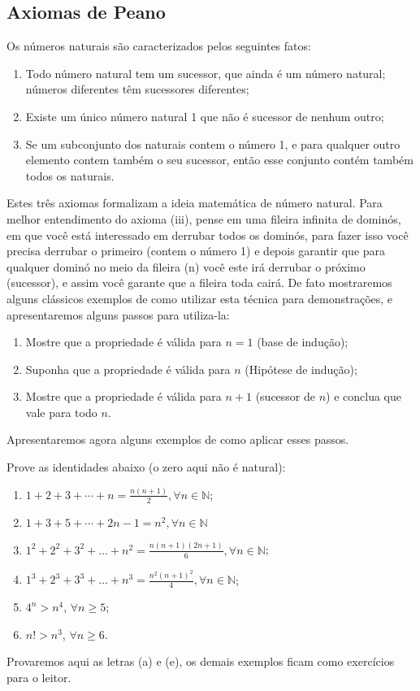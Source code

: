 \subsection{Axiomas de Peano}
\inic Os números naturais são caracterizados pelos seguintes fatos:
\begin{enumerate}
    \item [(i)] Todo número natural tem um sucessor, que ainda é um número natural; números diferentes têm sucessores diferentes;
    \item[(ii)] Existe um único número natural 1 que não é sucessor de nenhum outro;
    \item[(iii)] Se um subconjunto dos naturais contem o número 1, e para qualquer outro elemento contem também o seu sucessor, então esse conjunto contém também todos os naturais.
\end{enumerate}
\inic Estes três axiomas formalizam a ideia matemática de número natural. Para melhor entendimento do axioma (iii), pense em uma fileira infinita de dominós, em que você está interessado em derrubar todos os dominós, para fazer isso você precisa derrubar o primeiro (contem o número 1) e depois garantir que para qualquer dominó no meio da fileira (n) você este irá derrubar o próximo (sucessor), e assim você garante que a fileira toda cairá. De fato mostraremos alguns clássicos exemplos de como utilizar esta técnica para demonstrações, e apresentaremos alguns passos para utiliza-la:

\begin{enumerate}
    \item [(a)] Mostre que a propriedade é válida para $n=1$ (base de indução);
    \item[(b)] Suponha que a propriedade é válida para $n$ (Hipótese de indução);
    \item[(c)] Mostre que a propriedade é válida para $n+1$ (sucessor de $n$) e conclua que vale para todo $n$.
\end{enumerate}
\inic Apresentaremos agora alguns exemplos de como aplicar esses passos.

\begin{example}
 Prove as identidades abaixo (o zero aqui não é natural):
    \begin{enumerate}
        \item [(a)] $1+2+3+\cdots+n = \frac{n(n+1)}{2}, \forall n \in \mathbb{N}$;
        \item [(b)] $1+3+5+\cdots+2n-1 = n^2, \forall n \in \mathbb{N}$
        \item [(c)] $1^2 + 2^2 + 3^2 +... + n^2 = \frac{n(n+1)(2n+1)}{6}, \forall n \in \mathbb{N}$;
        \item [(d)] $1^3 + 2^3 + 3^3 +... + n^3 = \frac{n^2(n+1)^2}{4}, \forall n \in \mathbb{N}$;
        \item [(e)] $4^n >n^4$, $\forall n \geq 5$;
        \item [(f)] $n! > n^3$, $\forall n \geq 6$.
    \end{enumerate}
\end{example}
\inic Provaremos aqui as letras (a) e (e), os demais exemplos ficam como exercícios para o leitor.

